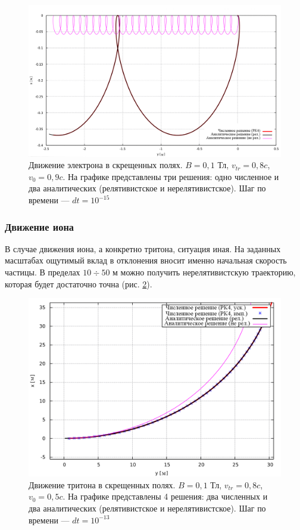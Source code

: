 \begin{figure}[h!]
\centering
\includegraphics[width=0.9\linewidth]{./fig/ch4/electron_very_fast.png}
\caption{Движение электрона в скрещенных полях. $B = 0,1 \text{ Тл}$, $v_{tr} = 0,8 c$, $v_0 = 0,9 c$. На графике представлены три решения: одно численное и два аналитических (релятивистское и нерелятивистское). Шаг по времени --- $dt = 10^{-15}$}
\label{fig:electron_very_fast}
\end{figure}





\subsubsection{Движение иона}

В случае движения иона, а конкретно тритона, ситуация иная. На заданных масштабах ощутимый вклад в отклонения вносит именно начальная скорость частицы. В пределах $10\div50 \text{ м}$ можно получить нерелятивистскую траекторию, которая будет достаточно точна (рис. \ref{fig:triton}).

\begin{figure}
\centering
\includegraphics[width=.8\linewidth]{./fig/ch4/triton}
\caption{Движение тритона в скрещенных полях. $B = 0,1 \text{ Тл}$, $v_{tr} = 0,8 c$, $v_0 = 0,5 c$. На графике представлены 4 решения: два численных и два аналитических (релятивистское и нерелятивистское). Шаг по времени --- $dt = 10^{-13}$}
\label{fig:triton}
\end{figure}



